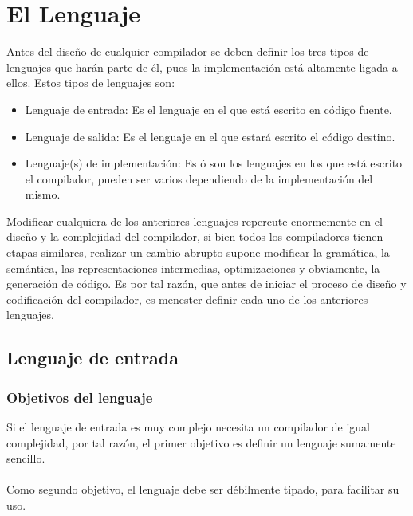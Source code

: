 
\chapter{El Lenguaje}


Antes del diseño de cualquier compilador se deben definir los tres tipos de lenguajes que harán parte de él, pues la implementación está altamente ligada a ellos. Estos tipos de lenguajes son:

\begin{itemize}
	\item Lenguaje de entrada: Es el lenguaje en el que está escrito en código fuente.
	\item Lenguaje de salida: Es el lenguaje en el que estará escrito el código destino.
	\item Lenguaje(s) de implementación: Es ó son los lenguajes en los que está escrito el compilador, pueden ser varios dependiendo de la implementación del mismo.
\end{itemize}

Modificar cualquiera de los anteriores lenguajes repercute enormemente en el diseño y la complejidad del compilador, si bien todos los compiladores tienen etapas similares, realizar un cambio abrupto supone modificar la gramática, la semántica, las representaciones intermedias, optimizaciones y obviamente, la generación de código.
Es por tal razón, que antes de iniciar el proceso de diseño y codificación del compilador, es menester definir cada uno de los anteriores lenguajes.

\section{Lenguaje de entrada}
	\subsection{Objetivos del lenguaje}
	
	Si el lenguaje de entrada es muy complejo necesita un compilador de igual complejidad, por tal razón, el primer objetivo es definir un lenguaje sumamente sencillo.\\\\

	Como segundo objetivo, el lenguaje debe ser débilmente tipado, para facilitar su uso.\\\\

